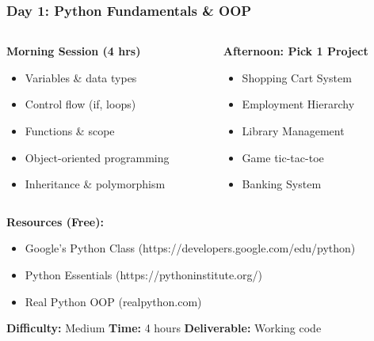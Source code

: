 \begin{frame}[fragile]\frametitle{Day 1: Python Fundamentals \& OOP}
\begin{columns}
    \begin{column}[T]{0.5\linewidth}
      \textbf{Morning Session (4 hrs)}
      \begin{itemize}
        \item Variables \& data types
        \item Control flow (if, loops)
        \item Functions \& scope
        \item Object-oriented programming
        \item Inheritance \& polymorphism
      \end{itemize}
    \end{column}
    \begin{column}[T]{0.5\linewidth}
      \textbf{Afternoon: Pick 1 Project}
      \begin{itemize}
        \item Shopping Cart System
        \item Employment Hierarchy
        \item Library Management
        \item Game tic-tac-toe
        \item Banking System
      \end{itemize}
    \end{column}
  \end{columns}
  
  \vspace{0.3cm}
  \textbf{Resources (Free):}
  \begin{itemize}
    \item Google's Python Class (https://developers.google.com/edu/python)
    \item Python Essentials (https://pythoninstitute.org/)
    \item Real Python OOP (realpython.com)
  \end{itemize}
  
\vspace{0.3cm}  
\textbf{Difficulty:} Medium \textbar \textbf{Time:} 4 hours \textbar \textbf{Deliverable:} Working code  
\end{frame}

